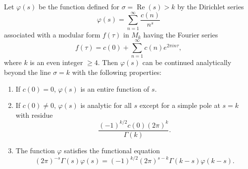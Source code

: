 Let $\varphi(s)$ be the function defined for $\sigma = \operatorname{Re}(s) > k$ by the Dirichlet series
$$\varphi(s) = \sum_{n=1}^{\infty} \frac{c(n)}{n^s}$$
associated with a modular form $f(\tau)$ in $M_k$ having the Fourier series
$$f(\tau) = c(0) + \sum_{n=1}^{\infty} c(n)e^{2\pi i n\tau},$$
where $k$ is an even integer $\geq 4$. Then $\varphi(s)$ can be continued analytically beyond the line $\sigma = k$ with the following properties:

\begin{enumerate}
\item[(a)] If $c(0) = 0$, $\varphi(s)$ is an entire function of $s$.
\item[(b)] If $c(0) \neq 0$, $\varphi(s)$ is analytic for all $s$ except for a simple pole at $s = k$ with residue
$$\frac{(-1)^{k/2} c(0) (2\pi)^k}{\Gamma(k)}.$$
\item[(c)] The function $\varphi$ satisfies the functional equation
$$(2\pi)^{-s} \Gamma(s) \varphi(s) = (-1)^{k/2} (2\pi)^{s-k} \Gamma(k-s) \varphi(k-s).$$
\end{enumerate}
